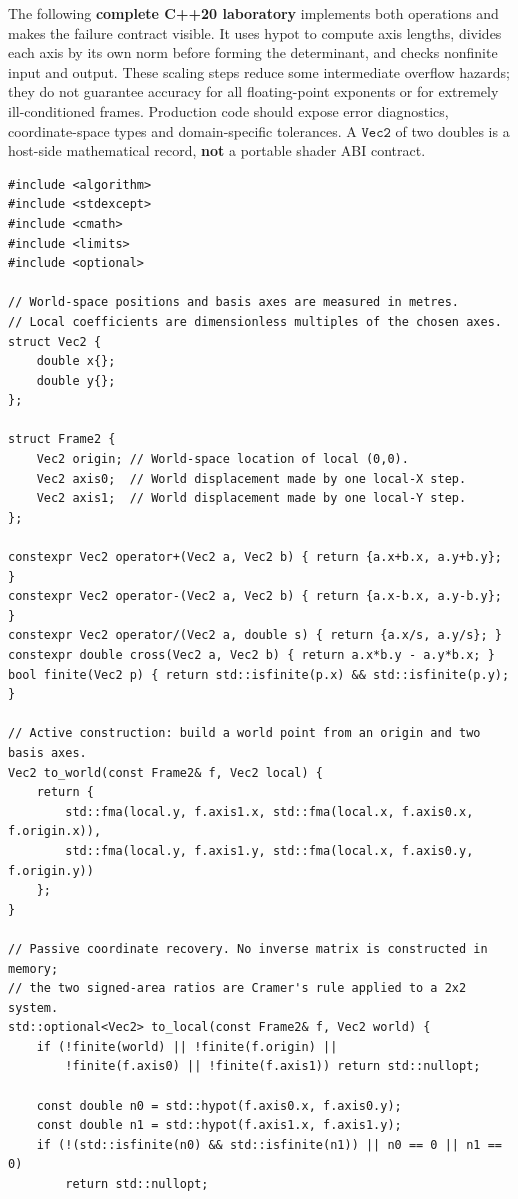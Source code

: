 The following \textbf{complete C++20 laboratory} implements both operations and makes the failure contract visible. It uses \(\mathrm{hypot}\) to compute axis lengths, divides each axis by its own norm before forming the determinant, and checks nonfinite input and output. These scaling steps reduce some intermediate overflow hazards; they do not guarantee accuracy for all floating-point exponents or for extremely ill-conditioned frames. Production code should expose error diagnostics, coordinate-space types and domain-specific tolerances. A \(\texttt{Vec2}\) of two doubles is a host-side mathematical record, \textbf{not} a portable shader ABI contract.

\begin{verbatim}
#include <algorithm>
#include <stdexcept>
#include <cmath>
#include <limits>
#include <optional>

// World-space positions and basis axes are measured in metres.
// Local coefficients are dimensionless multiples of the chosen axes.
struct Vec2 {
    double x{};
    double y{};
};

struct Frame2 {
    Vec2 origin; // World-space location of local (0,0).
    Vec2 axis0;  // World displacement made by one local-X step.
    Vec2 axis1;  // World displacement made by one local-Y step.
};

constexpr Vec2 operator+(Vec2 a, Vec2 b) { return {a.x+b.x, a.y+b.y}; }
constexpr Vec2 operator-(Vec2 a, Vec2 b) { return {a.x-b.x, a.y-b.y}; }
constexpr Vec2 operator/(Vec2 a, double s) { return {a.x/s, a.y/s}; }
constexpr double cross(Vec2 a, Vec2 b) { return a.x*b.y - a.y*b.x; }
bool finite(Vec2 p) { return std::isfinite(p.x) && std::isfinite(p.y); }

// Active construction: build a world point from an origin and two basis axes.
Vec2 to_world(const Frame2& f, Vec2 local) {
    return {
        std::fma(local.y, f.axis1.x, std::fma(local.x, f.axis0.x, f.origin.x)),
        std::fma(local.y, f.axis1.y, std::fma(local.x, f.axis0.y, f.origin.y))
    };
}

// Passive coordinate recovery. No inverse matrix is constructed in memory;
// the two signed-area ratios are Cramer's rule applied to a 2x2 system.
std::optional<Vec2> to_local(const Frame2& f, Vec2 world) {
    if (!finite(world) || !finite(f.origin) ||
        !finite(f.axis0) || !finite(f.axis1)) return std::nullopt;

    const double n0 = std::hypot(f.axis0.x, f.axis0.y);
    const double n1 = std::hypot(f.axis1.x, f.axis1.y);
    if (!(std::isfinite(n0) && std::isfinite(n1)) || n0 == 0 || n1 == 0)
        return std::nullopt;


\end{verbatim}
